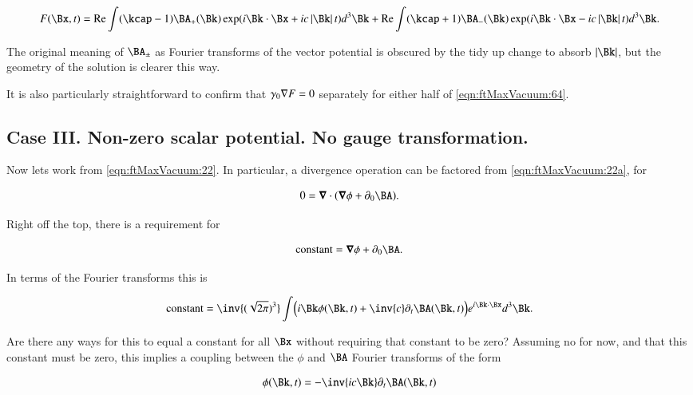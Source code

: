 \begin{align}\label{eqn:ftMaxVacuum:64}
F(\Bx, t)
= 
\Real \int ( \kcap - 1 ) \BA_{+}(\Bk) \exp(i \Bk \cdot \Bx + i c \Abs{\Bk} t) d^3 \Bk
+ \Real \int ( \kcap + 1 ) \BA_{-}(\Bk) \exp(i \Bk \cdot \Bx - i c \Abs{\Bk} t) d^3 \Bk.
\end{align}

The original meaning of $\BA_{\pm}$ as Fourier transforms of the vector potential is obscured by the tidy up change to absorb $\Abs{\Bk}$, but the geometry of the solution is clearer this way.

It is also particularly straightforward to confirm that $\gamma_0 \nabla F = 0$ separately for either half of \autoref{eqn:ftMaxVacuum:64}.

\subsection{Case III.  Non-zero scalar potential.  No gauge transformation.}

Now lets work from \autoref{eqn:ftMaxVacuum:22}.  In particular, a divergence operation can be factored from \autoref{eqn:ftMaxVacuum:22a}, for

\begin{align}\label{eqn:ftMaxVacuum:70}
0 = \spacegrad \cdot (\spacegrad \phi + \partial_0 \BA).
\end{align}

Right off the top, there is a requirement for 

\begin{align}\label{eqn:ftMaxVacuum:71}
\text{constant} = \spacegrad \phi + \partial_0 \BA.
\end{align}

In terms of the Fourier transforms this is

\begin{align}\label{eqn:ftMaxVacuum:72}
\text{constant} = 
\inv{(\sqrt{2 \pi})^3} \int 
\Bigl(
i \Bk \phi(\Bk, t) + \inv{c} \partial_t \BA(\Bk, t)
\Bigr)
e^{i \Bk \cdot \Bx } d^3 \Bk.
\end{align}

Are there any ways for this to equal a constant for all $\Bx$ without requiring that constant to be zero?  Assuming no for now, and that this constant must be zero, this implies a coupling between the $\phi$ and $\BA$ Fourier transforms of the form

\begin{align}
\label{eqn:ftMaxVacuum:73}
\phi(\Bk, t) = -\inv{i c \Bk} \partial_t \BA(\Bk, t)
\end{align}

